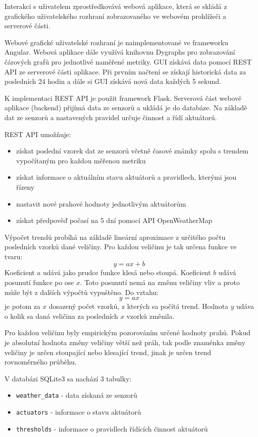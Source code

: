 \documentclass[11pt,a4paper]{article}
\begin{document}
Interakci s uživatelem zprostředkovává webová aplikace, která se skládá z grafického uživatelského rozhraní zobrazovaného ve webovém prohlížeči a serverové části.

Webové grafické uživatelské rozhraní je naimplementované ve frameworku Angular. Webová aplikace dále využívá knihovnu Dygraphs pro zobrazování čárových grafů pro jednotlivé naměřené metriky. GUI získává data pomocí REST API ze serverové části aplikace. Při prvním načtení se získají historická data za posledních 24 hodin a dále si GUI získává nová data každých 5 sekund.

K implementaci REST API je použit framework Flask.
Serverová část webové aplikace (backend) přijímá data ze senzorů a ukládá je do databáze.
Na základě dat ze senzorů a nastavených pravidel určuje činnost a řídí aktuátorů.

REST API umožňuje:
\begin{itemize}
    \item získat poslední vzorek dat ze senzorů včetně časové známky spolu s trendem vypočítaným pro každou měřenou metriku
    \item získat informace o aktuálním stavu aktuátorů a pravidlech, kterými jsou řízeny
    \item nastavit nové prahové hodnoty jednotlivým aktuátorům
    \item získat předpověď počasí na 5 dní pomocí API OpenWeatherMap
\end{itemize}

Výpočet trendů probíhá na základě lineární aproximace z určitého počtu posledních vzorků dané veličiny.
Pro každou veličinu je tak určena funkce ve tvaru:
\[
    y = a x + b
\]
Koeficient $a$ udává jako prudce funkce klesá nebo stoupá.
Koeficient $b$ udává posunutí funkce po ose $x$.
Toto posunutí nemá na změnu veličiny vliv a proto může být z dalších výpočtů vypuštěno.
Do vztahu:
\[
    y = a x
\]
je potom za $x$ dosazený počet vzorků, z kterých sa počítá trend.
Hodnota $y$ udáva o kolik sa daná veličina za posledních $x$ vzorků změnila.

Pro každou veličinu byly empirickým pozorováním určené hodnoty prahů.
Pokud je absolutní hodnota změny veličiny větší než práh, tak podle znaménka změny veličiny je určen stoupající nebo klesající trend, jinak je určen trend rovnoměrného průběhu.

V databázi SQLite3 sa nachází 3 tabulky:
\begin{itemize}
    \item \texttt{weather\_data} - data získaná ze senzorů
    \item \texttt{actuators} - informace o stavu aktuátorů
    \item \texttt{thresholds} - informace o pravidlech řídících činnost aktuátorů
\end{itemize}
\end{document}
